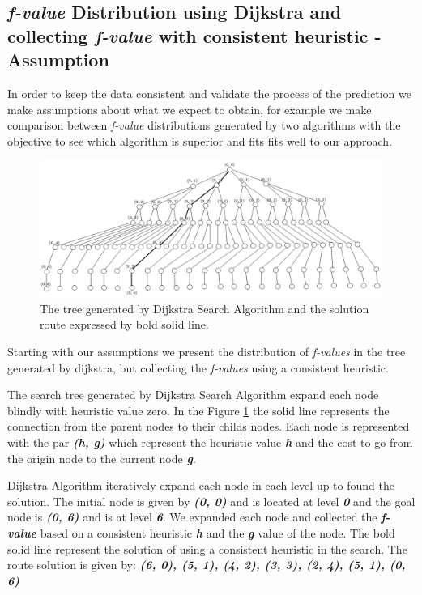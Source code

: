 \documentclass[11pt,a4paper,oneside]{report}
\begin{document}
\subsection{\textit{f-value} Distribution using Dijkstra and collecting \textit{f-value} with consistent heuristic - Assumption }
In order to keep the data consistent and validate the process of the prediction we make assumptions about what we expect to obtain, for example we make comparison between \textit{f-value} distributions generated by two algorithms with the objective to see which algorithm is superior and fits fits well to our approach.\newline

\begin{figure}[htb]
\begin{center}
\includegraphics[width=12cm]{./image/dijkstraCollecting}
\caption{The tree generated by Dijkstra Search Algorithm and the solution route expressed by bold solid line. }
\label{fig:dijkstraTreeConsistentHeuristic}
\end{center}
\end{figure}

Starting with our assumptions we present the distribution of \textit{f-values} in the tree generated by dijkstra, but collecting the \textit{f-values} using a consistent heuristic.

The search tree generated by Dijkstra Search Algorithm expand each node blindly with heuristic value zero. In the Figure \ref{fig:dijkstraTreeConsistentHeuristic} the solid line represents the connection from the parent nodes to their childs nodes. Each node is represented with the par \textbf{\textit{(h, g)}} which represent the heuristic value \textbf{\textit{h}} and the cost to go from the origin node to the current node \textbf{\textit{g}}.\newline 

Dijkstra Algorithm iteratively expand each node in each level up to found the solution. The initial node is given by \textbf{\textit{(0, 0)}} and is located at level \textbf{\textit{0}} and the goal node is \textbf{\textit{(0, 6)}} and is at level \textbf{\textit{6}}. We expanded each node and collected the \textbf{\textit{f-value}} based on a consistent heuristic \textbf{\textit{h}} and the \textbf{\textit{g}} value of the node. The bold solid line represent the solution of using a consistent heuristic in the search. The route solution is given by: \textbf{\textit{(6, 0), (5, 1), (4, 2), (3, 3), (2, 4), (5, 1), (0, 6)}}\newline
\end{document}
